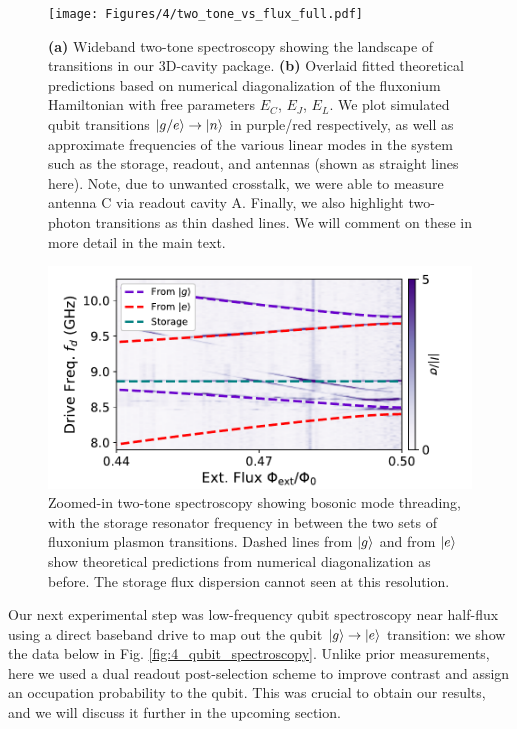 \begin{figure}[t]
    \centering
    \texttt{[image: Figures/4/two\_tone\_vs\_flux\_full.pdf]}
    \caption{\textbf{(a)} Wideband two-tone spectroscopy showing the landscape of transitions in our 3D-cavity package. \textbf{(b)} Overlaid fitted theoretical predictions based on numerical diagonalization of the fluxonium Hamiltonian with free parameters $E_C$, $E_J$, $E_L$. We plot simulated qubit transitions $\lvert g/e\rangle\to\lvert n\rangle$ in purple/red respectively, as well as approximate frequencies of the various linear modes in the system such as the storage, readout, and antennas (shown as straight lines here). Note, due to unwanted crosstalk, we were able to measure antenna C via readout cavity A. Finally, we also highlight two-photon transitions as thin dashed lines. We will comment on these in more detail in the main text.}
\label{fig:4_two_tone_vs_flux_full}
\end{figure}
\clearpage
\begin{figure}[hp]
    \centering
    \includegraphics[width=0.73\linewidth]{Figures/4/two_tone_vs_flux_zoom.pdf}
    \caption{Zoomed-in two-tone spectroscopy showing bosonic mode threading, with the storage resonator frequency in between the two sets of fluxonium plasmon transitions. Dashed lines from $\lvert g\rangle$ and from $\lvert e\rangle$ show theoretical predictions from numerical diagonalization as before. The storage flux dispersion cannot seen at this resolution.}
\label{fig:4_two_tone_vs_flux_zoom}
\end{figure}

Our next experimental step was low-frequency qubit spectroscopy near half-flux using a direct baseband drive to map out the qubit  $\lvert g\rangle\to\lvert e\rangle$ transition: we show the data below in Fig. \ref{fig:4_qubit_spectroscopy}. Unlike prior measurements, here we used a dual readout post-selection scheme \cite{ding2023FTF} to improve contrast and assign an occupation probability to the qubit. This was crucial to obtain our results, and we will discuss it further in the upcoming section.

